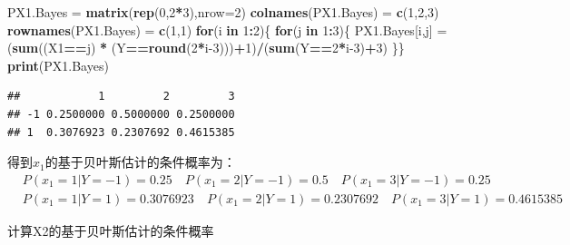 \documentclass[
]{ctexart}
\newenvironment{Shaded}{\begin{snugshade}}{\end{snugshade}}
\newcommand{\AttributeTok}[1]{\textcolor[rgb]{0.13,0.29,0.53}{#1}}
\newcommand{\ControlFlowTok}[1]{\textcolor[rgb]{0.13,0.29,0.53}{\textbf{#1}}}
\newcommand{\DecValTok}[1]{\textcolor[rgb]{0.00,0.00,0.81}{#1}}
\newcommand{\FunctionTok}[1]{\textcolor[rgb]{0.13,0.29,0.53}{\textbf{#1}}}
\newcommand{\NormalTok}[1]{#1}
\newcommand{\OtherTok}[1]{\textcolor[rgb]{0.56,0.35,0.01}{#1}}
\newcommand{\SpecialCharTok}[1]{\textcolor[rgb]{0.81,0.36,0.00}{\textbf{#1}}}
\newcommand{\StringTok}[1]{\textcolor[rgb]{0.31,0.60,0.02}{#1}}
\begin{document}
\begin{Shaded}
\begin{Highlighting}[]
\NormalTok{PX1.Bayes }\OtherTok{=} \FunctionTok{matrix}\NormalTok{(}\FunctionTok{rep}\NormalTok{(}\DecValTok{0}\NormalTok{,}\DecValTok{2}\SpecialCharTok{*}\DecValTok{3}\NormalTok{),}\AttributeTok{nrow=}\DecValTok{2}\NormalTok{)}
\FunctionTok{colnames}\NormalTok{(PX1.Bayes) }\OtherTok{=} \FunctionTok{c}\NormalTok{(}\StringTok{\textquotesingle{}1\textquotesingle{}}\NormalTok{,}\StringTok{\textquotesingle{}2\textquotesingle{}}\NormalTok{,}\StringTok{\textquotesingle{}3\textquotesingle{}}\NormalTok{)}
\FunctionTok{rownames}\NormalTok{(PX1.Bayes) }\OtherTok{=} \FunctionTok{c}\NormalTok{(}\StringTok{\textquotesingle{}{-}1\textquotesingle{}}\NormalTok{,}\StringTok{\textquotesingle{}1\textquotesingle{}}\NormalTok{)}
\ControlFlowTok{for}\NormalTok{(i }\ControlFlowTok{in} \DecValTok{1}\SpecialCharTok{:}\DecValTok{2}\NormalTok{)\{}
  \ControlFlowTok{for}\NormalTok{(j }\ControlFlowTok{in} \DecValTok{1}\SpecialCharTok{:}\DecValTok{3}\NormalTok{)\{}
\NormalTok{    PX1.Bayes[i,j] }\OtherTok{=}\NormalTok{ (}\FunctionTok{sum}\NormalTok{((X1}\SpecialCharTok{==}\NormalTok{j) }\SpecialCharTok{*}\NormalTok{ (Y}\SpecialCharTok{==}\FunctionTok{round}\NormalTok{(}\DecValTok{2}\SpecialCharTok{*}\NormalTok{i}\DecValTok{{-}3}\NormalTok{)))}\SpecialCharTok{+}\DecValTok{1}\NormalTok{)}\SpecialCharTok{/}\NormalTok{(}\FunctionTok{sum}\NormalTok{(Y}\SpecialCharTok{==}\DecValTok{2}\SpecialCharTok{*}\NormalTok{i}\DecValTok{{-}3}\NormalTok{)}\SpecialCharTok{+}\DecValTok{3}\NormalTok{)}
\NormalTok{  \}\}}
\FunctionTok{print}\NormalTok{(PX1.Bayes)}
\end{Highlighting}
\end{Shaded}

\begin{verbatim}
##            1         2         3
## -1 0.2500000 0.5000000 0.2500000
## 1  0.3076923 0.2307692 0.4615385
\end{verbatim}

得到\(x_1\)的基于贝叶斯估计的条件概率为： \begin{align*}
& P(x_1 = 1|Y=-1) = 0.25 \quad P(x_1 = 2|Y=-1) = 0.5 \quad P(x_1 = 3|Y=-1) = 0.25 \\
& P(x_1 = 1|Y=1) = 0.3076923 \quad P(x_1 = 2|Y=1) = 0.2307692 \quad P(x_1 = 3|Y=1) = 0.4615385 
\end{align*}

计算X2的基于贝叶斯估计的条件概率
\end{document}
